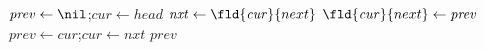 \documentclass[varwidth=14cm,border=3pt]{standalone}
\begin{document}
\begin{algorithmic}[1]
  \State $\mathit{prev} \gets \nil$;\quad $\mathit{cur} \gets \mathit{head}$
   
    \State $\mathit{nxt} \gets \fld{\mathit{cur}}{next}$
    \State $\fld{\mathit{cur}}{next} \gets \mathit{prev}$ 
    \State $\mathit{prev} \gets \mathit{cur}$;\quad $\mathit{cur} \gets \mathit{nxt}$
  \EndWhile
  \State \Return $\mathit{prev}$ 
\EndFunction
\end{algorithmic}
\end{document}
